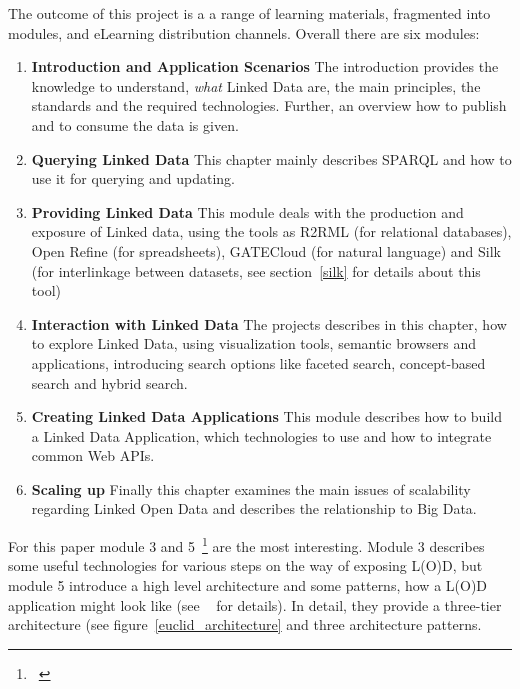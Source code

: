 The outcome of this project is a a range of learning materials, fragmented into modules, and eLearning distribution channels. Overall there are six modules:

\begin{enumerate}
	\item \textbf{Introduction and Application Scenarios}
	The introduction provides the knowledge to understand, \emph{what} Linked Data are, the main principles, the standards and the required technologies. Further, an overview how to publish and to consume the data is given.
	\item \textbf{Querying Linked Data}
	This chapter mainly describes SPARQL and how to use it for querying and updating.
	\item \textbf{Providing Linked Data}
	This module deals with the production and exposure of Linked data, using the tools as R2RML (for relational databases), Open Refine (for spreadsheets), GATECloud (for natural language) and Silk (for interlinkage between datasets, see section~\ref{silk} for details about this tool)
	\item \textbf{Interaction with Linked Data}
	The projects describes in this chapter, how to explore Linked Data, using visualization tools, semantic browsers and applications, introducing search options like faceted search, concept-based search and hybrid search.
	\item \textbf{Creating Linked Data Applications}
	This module describes how to build a Linked Data Application, which technologies to use and how to integrate common Web APIs.
	\item \textbf{Scaling up}
	Finally this chapter examines the main issues of scalability regarding Linked Open Data and describes the relationship to Big Data.
\end{enumerate}

For this paper module 3 and 5~\footnote{~\cite{euclid:chap5}} are the most interesting. Module 3 describes some useful technologies for various steps on the way of exposing L(O)D, but module 5 introduce a high level architecture and some patterns, how a L(O)D application might look like (see ~\cite{euclid:chap5} for details). In detail, they provide a three-tier architecture (see figure~\ref{euclid_architecture} and three architecture patterns.

